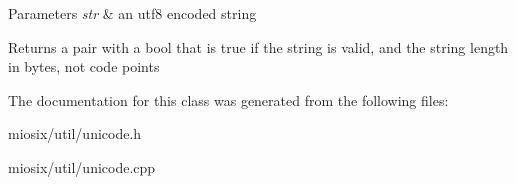 \begin{DoxyParams}{Parameters}
{\em str} & an utf8 encoded string \\
\hline
\end{DoxyParams}
\begin{DoxyReturn}{Returns}
a pair with a bool that is true if the string is valid, and the string length in bytes, not code points 
\end{DoxyReturn}


The documentation for this class was generated from the following files\-:\begin{DoxyCompactItemize}
\item 
miosix/util/unicode.\-h\item 
miosix/util/unicode.\-cpp\end{DoxyCompactItemize}
